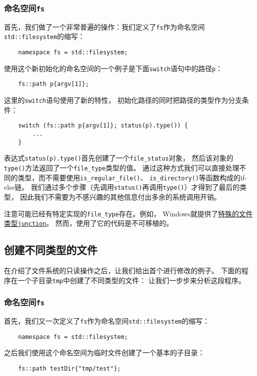 \subsubsection{命名空间\texttt{fs}}
首先，我们做了一个非常普遍的操作：我们定义了\texttt{fs}作为命名空间
\texttt{std::filesystem}的缩写：
\begin{lstlisting}
    namespace fs = std::filesystem;
\end{lstlisting}
使用这个新初始化的命名空间的一个例子是下面\texttt{switch}语句中的路径\texttt{p}：
\begin{lstlisting}
    fs::path p{argv[1]};
\end{lstlisting}
这里的\texttt{switch}语句使用了新的特性，
初始化路径的同时把路径的类型作为分支条件：
\begin{lstlisting}
    switch (fs::path p{argv[1]}; status(p).type()) {
        ...
    }
\end{lstlisting}
表达式\texttt{status(p).type()}首先创建了一个\texttt{file\_status}对象，
然后该对象的\texttt{type()}方法返回了一个\texttt{file\_type}类型的值。
通过这种方式我们可以直接处理不同的类型，而不需要使用\texttt{is\_regular\_file()}、
\texttt{is\_directory()}等函数构成的if-else链。
我们通过多个步骤（先调用\texttt{status()}再调用\texttt{type()}）才得到了最后的类型，
因此我们不需要为不感兴趣的其他信息付出多余的系统调用开销。

注意可能已经有特定实现的\texttt{file\_type}存在。例如，
Windows就提供了\hyperref[junction]{特殊的文件类型\texttt{junction}}。
然而，使用了它的代码是不可移植的。

\subsection{创建不同类型的文件}\label{ch20.1.3}
在介绍了文件系统的只读操作之后，让我们给出首个进行修改的例子。
下面的程序在一个子目录\texttt{tmp}中创建了不同类型的文件：
让我们一步步来分析这段程序。

\subsubsection{命名空间\texttt{fs}}
首先，我们又一次定义了\texttt{fs}作为命名空间\texttt{std::filesystem}的缩写：
\begin{lstlisting}
    namespace fs = std::filesystem;
\end{lstlisting}
之后我们使用这个命名空间为临时文件创建了一个基本的子目录：
\begin{lstlisting}
    fs::path testDir{"tmp/test"};
\end{lstlisting}

